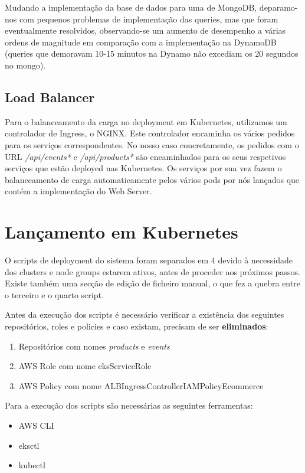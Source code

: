 \documentclass[11pt,a4paper]{article}
\begin{document}
Mudando a implementação da base de dados para uma de MongoDB, deparamo-nos com pequenos problemas de implementação das queries, mas que foram eventualmente resolvidos, observando-se um aumento de desempenho a várias ordens de magnitude em comparação com a implementação na DynamoDB (queries que demoravam 10-15 minutos na Dynamo não excediam os 20 segundos no mongo).

\subsection{Load Balancer}
Para o balanceamento da carga no deployment em Kubernetes, utilizamos um controlador de Ingress, o NGINX. Este controlador encaminha os vários pedidos para os serviços correspondentes. No nosso caso concretamente, os pedidos com o URL \textit{/api/events*} e \textit{/api/products*} são encaminhados para os seus respetivos serviços que estão deployed nas Kubernetes. Os serviços por sua vez fazem o balanceamento de carga automaticamente pelos vários pods por nós lançados que contém a implementação do Web Server.

\section{Lançamento em Kubernetes}
O scripts de deployment do sistema foram separados em 4 devido à necessidade dos clusters e node groups estarem ativos, antes de proceder aos próximos passos. Existe também uma secção de edição de ficheiro manual, o que fez a quebra entre o terceiro e o quarto script.

Antes da execução dos scripts é necessário verificar a existência dos seguintes repositórios, roles e policies e caso existam, precisam de ser \textbf{eliminados}:
\begin{enumerate}
	\item Repositórios com nomes \textit{products} e \textit{events}
	\item AWS Role com nome eksServiceRole
	\item AWS Policy com nome ALBIngressControllerIAMPolicyEcommerce
\end{enumerate}

Para a execução dos scripts são necessárias as seguintes ferramentas:
\begin{itemize}
	\item AWS CLI
	\item eksctl
	\item kubectl
\end{itemize}
\end{document}
